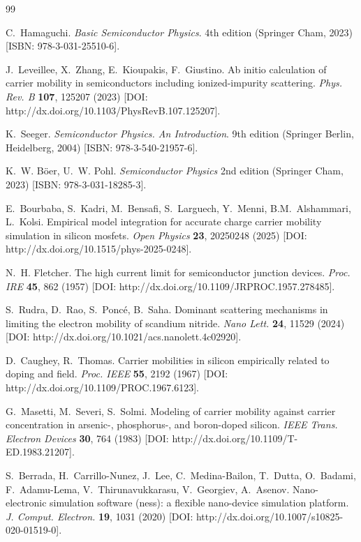 \documentclass[fleqn,twoside,twocolumn,nofootinbib,showkeys]{revtex4} %
\begin{document}
\begin{thebibliography}{99}                                                                                                %

C.~Hamaguchi. \textit{Basic Semiconductor Physics}. 4th edition (Springer Cham, 2023) [ISBN: 978-3-031-25510-6].

J.~Leveillee, X.~Zhang, E.~Kioupakis, F.~Giustino. Ab initio calculation of carrier mobility in semiconductors including ionized-impurity scattering. \textit{Phys. Rev. B} \textbf{107}, 125207 (2023) [DOI: http://dx.doi.org/10.1103/PhysRevB.107.125207].

K.~Seeger. \textit{Semiconductor Physics. An Introduction}. 9th edition (Springer Berlin, Heidelberg, 2004) [ISBN: 978-3-540-21957-6].

K.~W. B\"oer, U.~W. Pohl. \textit{Semiconductor Physics} 2nd edition (Springer Cham, 2023) [ISBN: 978-3-031-18285-3].

E.~Bourbaba, S.~Kadri, M.~Bensafi, S.~Larguech, Y.~Menni, B.M.~Alshammari, L.~Kolsi. Empirical model integration for accurate charge carrier mobility simulation in silicon mosfets. \textit{Open Physics} \textbf{23}, 20250248 (2025) [DOI: http://dx.doi.org/10.1515/phys-2025-0248].

N.~H. Fletcher. The high current limit for semiconductor junction devices. \textit{Proc. IRE} \textbf{45}, 862 (1957) [DOI: http://dx.doi.org/10.1109/JRPROC.1957.278485].

S.~Rudra, D.~Rao, S.~Ponc{\'e}, B.~Saha. Dominant scattering mechanisms in limiting the electron mobility of scandium nitride. \textit{Nano Lett.} \textbf{24}, 11529 (2024) [DOI: http://dx.doi.org/10.1021/acs.nanolett.4c02920].

D.~Caughey, R.~Thomas. Carrier mobilities in silicon empirically related to doping and field. \textit{Proc. IEEE} \textbf{55}, 2192 (1967) [DOI: http://dx.doi.org/10.1109/PROC.1967.6123].

G.~Masetti, M.~Severi, S.~Solmi. Modeling of carrier mobility against carrier concentration in arsenic-, phosphorus-, and boron-doped silicon. \textit{IEEE Trans. Electron Devices} \textbf{30}, 764 (1983) [DOI: http://dx.doi.org/10.1109/T-ED.1983.21207].

S.~Berrada, H.~Carrillo-Nunez, J.~Lee, C.~Medina-Bailon, T.~Dutta, O.~Badami, F.~Adamu-Lema, V.~Thirunavukkarasu, V.~Georgiev, A.~Asenov. Nano-electronic simulation software (ness): a flexible nano-device simulation platform. \textit{J. Comput. Electron.} \textbf{19}, 1031 (2020) [DOI: http://dx.doi.org/10.1007/s10825-020-01519-0].


\end{thebibliography}
\end{document}
